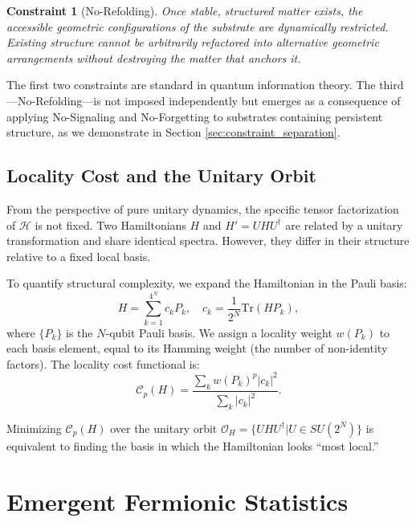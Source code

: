 \documentclass[11pt]{article}
\newtheorem{constraint}{Constraint}
\begin{document}
\begin{constraint}[No-Refolding]
Once stable, structured matter exists, the accessible geometric configurations of the substrate are dynamically restricted. Existing structure cannot be arbitrarily refactored into alternative geometric arrangements without destroying the matter that anchors it.
\end{constraint}

The first two constraints are standard in quantum information theory. The third---No-Refolding---is not imposed independently but emerges as a consequence of applying No-Signaling and No-Forgetting to substrates containing persistent structure, as we demonstrate in Section \ref{sec:constraint_separation}.

\subsection{Locality Cost and the Unitary Orbit}

From the perspective of pure unitary dynamics, the specific tensor factorization of $\mathcal{H}$ is not fixed. Two Hamiltonians $H$ and $H' = UHU^\dagger$ are related by a unitary transformation and share identical spectra. However, they differ in their structure relative to a fixed local basis.

To quantify structural complexity, we expand the Hamiltonian in the Pauli basis:
\begin{equation}
H = \sum_{k=1}^{4^N} c_k P_k, \quad c_k = \frac{1}{2^N} \text{Tr}(H P_k),
\end{equation}
where $\{P_k\}$ is the $N$-qubit Pauli basis. We assign a locality weight $w(P_k)$ to each basis element, equal to its Hamming weight (the number of non-identity factors). The locality cost functional is:
\begin{equation}
\mathcal{C}_p(H) = \frac{\sum_k w(P_k)^p |c_k|^2}{\sum_k |c_k|^2}.
\end{equation}

Minimizing $\mathcal{C}_p(H)$ over the unitary orbit $\mathcal{O}_H = \{UHU^\dagger | U \in SU(2^N)\}$ is equivalent to finding the basis in which the Hamiltonian looks ``most local.''

\section{Emergent Fermionic Statistics}
\end{document}
